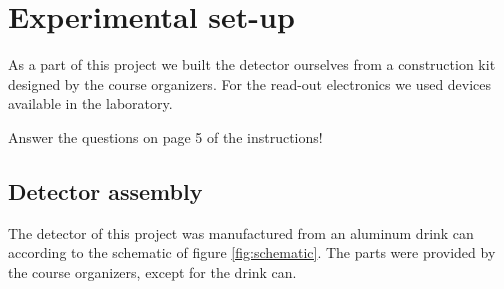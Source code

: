 \documentclass[a4paper]{article}
\newenvironment{todo}{
\color{red}
}
{
}
\begin{document}

\clearpage
\section{Experimental set-up}
\label{setup}
As a part of this project we built the detector ourselves from a construction kit designed by the course organizers.
For the read-out electronics we used devices available in the laboratory.

Answer the questions on page 5 of the instructions!


\subsection{Detector assembly}
\label{assembly}
The detector of this project was manufactured from an aluminum drink can according to the schematic of figure \ref{fig:schematic}.
The parts were provided by the course organizers, except for the drink can.
\end{document}
